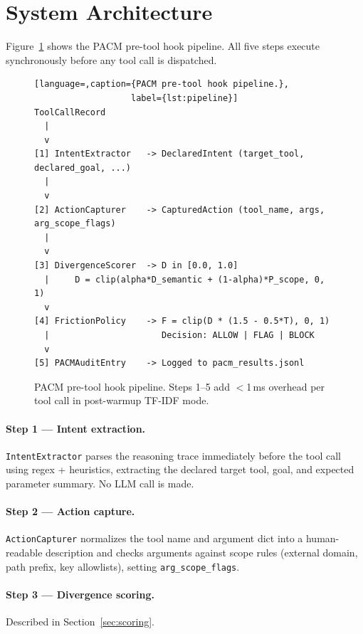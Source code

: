 \documentclass[11pt,letterpaper]{article}
\newcommand{\pacm}{\textsc{PACM}}
\begin{document}
\section{System Architecture}
\label{sec:architecture}

Figure~\ref{fig:pipeline} shows the \pacm{} pre-tool hook pipeline. All five
steps execute synchronously before any tool call is dispatched.

\begin{figure}[htbp]
\centering
\begin{lstlisting}[language=,caption={PACM pre-tool hook pipeline.},
                   label={lst:pipeline}]
ToolCallRecord
  |
  v
[1] IntentExtractor   -> DeclaredIntent (target_tool, declared_goal, ...)
  |
  v
[2] ActionCapturer    -> CapturedAction (tool_name, args, arg_scope_flags)
  |
  v
[3] DivergenceScorer  -> D in [0.0, 1.0]
  |     D = clip(alpha*D_semantic + (1-alpha)*P_scope, 0, 1)
  v
[4] FrictionPolicy    -> F = clip(D * (1.5 - 0.5*T), 0, 1)
  |                      Decision: ALLOW | FLAG | BLOCK
  v
[5] PACMAuditEntry    -> Logged to pacm_results.jsonl
\end{lstlisting}
\caption{\pacm{} pre-tool hook pipeline. Steps 1--5 add $<$1\,ms overhead
per tool call in post-warmup TF-IDF mode.}
\label{fig:pipeline}
\end{figure}

\paragraph{Step 1 --- Intent extraction.}
\texttt{IntentExtractor} parses the reasoning trace immediately before the
tool call using regex + heuristics, extracting the declared target tool,
goal, and expected parameter summary. No LLM call is made.

\paragraph{Step 2 --- Action capture.}
\texttt{ActionCapturer} normalizes the tool name and argument dict into a
human-readable description and checks arguments against scope rules
(external domain, path prefix, key allowlists), setting \texttt{arg\_scope\_flags}.

\paragraph{Step 3 --- Divergence scoring.}
Described in Section~\ref{sec:scoring}.
\end{document}
